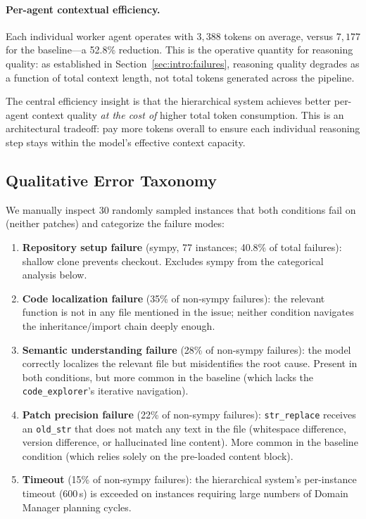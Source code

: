 \paragraph{Per-agent contextual efficiency.} Each individual worker agent
operates with $3{,}388$ tokens on average, versus $7{,}177$ for the
baseline---a 52.8\% reduction. This is the operative quantity for reasoning
quality: as established in Section~\ref{sec:intro:failures}, reasoning
quality degrades as a function of total context length, not total tokens
generated across the pipeline.

The central efficiency insight is that the hierarchical system achieves
better per-agent context quality \emph{at the cost of} higher total token
consumption. This is an architectural tradeoff: pay more tokens overall to
ensure each individual reasoning step stays within the model's effective
context capacity.

\subsection{Qualitative Error Taxonomy}
\label{sec:analysis:errors}

We manually inspect 30 randomly sampled instances that both conditions fail
on (neither patches) and categorize the failure modes:

\begin{enumerate}
  \item \textbf{Repository setup failure} (sympy, 77 instances; 40.8\% of
    total failures): shallow clone prevents checkout. Excludes sympy from
    the categorical analysis below.

  \item \textbf{Code localization failure} (35\% of non-sympy failures):
    the relevant function is not in any file mentioned in the issue; neither
    condition navigates the inheritance/import chain deeply enough.

  \item \textbf{Semantic understanding failure} (28\% of non-sympy failures):
    the model correctly localizes the relevant file but misidentifies the
    root cause. Present in both conditions, but more common in the baseline
    (which lacks the \texttt{code\_explorer}'s iterative navigation).

  \item \textbf{Patch precision failure} (22\% of non-sympy failures):
    \texttt{str\_replace} receives an \texttt{old\_str} that does not
    match any text in the file (whitespace difference, version difference,
    or hallucinated line content). More common in the baseline condition
    (which relies solely on the pre-loaded content block).

  \item \textbf{Timeout} (15\% of non-sympy failures): the hierarchical
    system's per-instance timeout (600\,s) is exceeded on instances requiring
    large numbers of Domain Manager planning cycles.
\end{enumerate}
